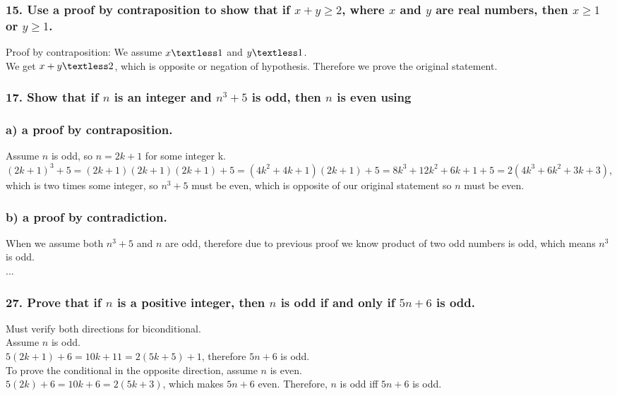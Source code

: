 \documentclass[11pt, oneside]{article} %
\numberwithin{equation}{section} %
\numberwithin{figure}{section} %
\numberwithin{table}{section} %
\begin{document}
\subsubsection{15. Use a proof by contraposition to show that if $x + y \geq 2$, where $x$ and $y$ are real numbers, then $x\geq1$ or $y\geq1$.}
Proof by contraposition: We assume $x\textless1$ and $y\textless1$. \\
We get $x + y \textless 2$, which is opposite or negation of hypothesis. Therefore we prove the original statement. 

\subsubsection{17. Show that if $n$ is an integer and $n^3+5$ is odd, then $n$ is even using}
\subsubsection{a) a proof by contraposition.}
Assume $n$ is odd, so $n=2k+1$ for some integer k.\\
$(2k+1)^3 + 5 = (2k+1)(2k+1)(2k+1) + 5 = (4k^2+4k+1)(2k+1) +5 = 8k^3 + 12k^2 + 6k + 1 + 5 = 2(4k^3+6k^2+3k + 3)$, which is two times some integer, so $n^3+5$ must be even, which is opposite of our original statement so $n$ must be even.

\subsubsection{b) a proof by contradiction.}
When we assume both $n^3 +5$ and $n$ are odd, therefore due to previous proof we know product of two odd numbers is odd, which means $n^3$ is odd.\\
...
\subsubsection{27. Prove that if $n$ is a positive integer, then $n$ is odd if and only if $5n + 6$ is odd.}
Must verify both directions for biconditional. \\
Assume $n$ is odd.\\
$5(2k+1) + 6 = 10k + 11 = 2(5k+5)+1$, therefore $5n + 6$ is odd.\\
To prove the conditional in the opposite direction, assume $n$ is even.\\
$5(2k)+ 6 = 10k + 6 = 2(5k +3)$, which makes $5n+6$ even. Therefore, $n$ is odd iff $5n+6$ is odd.
\end{document}
